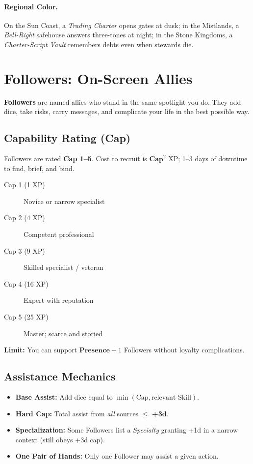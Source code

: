 \paragraph{Regional Color.}
On the Sun Coast, a \emph{Trading Charter} opens gates at dusk; in the Mistlands, a \emph{Bell-Right} safehouse answers three-tones at night; in the Stone Kingdoms, a \emph{Charter-Script Vault} remembers debts even when stewards die.

\section{Followers: On-Screen Allies}

\textbf{Followers} are named allies who stand in the same spotlight you do. They add dice, take risks, carry messages, and complicate your life in the best possible way.

\subsection*{Capability Rating (Cap)}
Followers are rated \textbf{Cap 1–5}. Cost to recruit is \(\textbf{Cap}^2\) XP; 1–3 days of downtime to find, brief, and bind.
\begin{description}
  \item[Cap 1 (1 XP)] Novice or narrow specialist
  \item[Cap 2 (4 XP)] Competent professional
  \item[Cap 3 (9 XP)] Skilled specialist / veteran
  \item[Cap 4 (16 XP)] Expert with reputation
  \item[Cap 5 (25 XP)] Master; scarce and storied
\end{description}
\textbf{Limit:} You can support \(\textbf{Presence} + 1\) Followers without loyalty complications. 

\subsection*{Assistance Mechanics}
\begin{itemize}
  \item \textbf{Base Assist:} Add dice equal to \(\min(\text{Cap}, \text{relevant Skill})\).
  \item \textbf{Hard Cap:} Total assist from \emph{all} sources \(\leq\) \textbf{+3d}. 
  \item \textbf{Specialization:} Some Followers list a \emph{Specialty} granting +1d in a narrow context (still obeys +3d cap).
  \item \textbf{One Pair of Hands:} Only one Follower may assist a given action.
\end{itemize}

